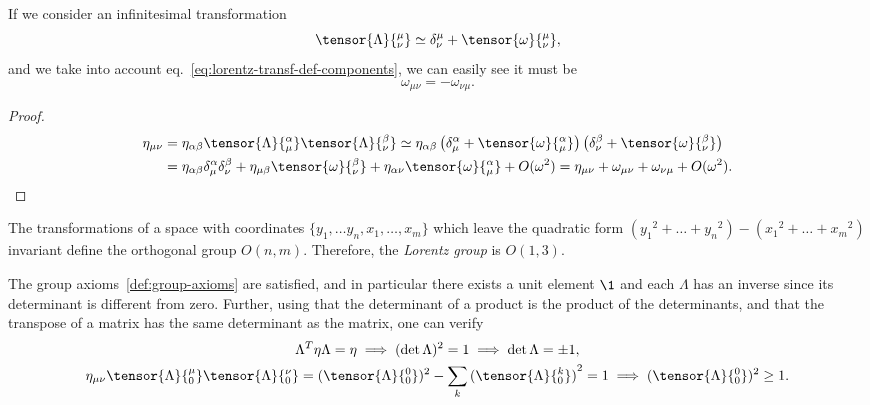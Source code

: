 If we consider an infinitesimal transformation
\begin{equation}
    \tensor{\Lambda}{^\mu_\nu} \simeq \delta^\mu_\nu + \tensor{\omega}{^\mu_\nu} ,
\end{equation}
and we take into account eq.~\eqref{eq:lorentz-transf-def-components}, we can easily see it must be
\begin{equation}\label{eq:parameters-lorentz}
    \omega_{\mu\nu} = -\omega_{\nu\mu} .
\end{equation}
\begin{proof}
    \begin{equation}
    \begin{split}
        \eta_{\mu\nu} &= \eta_{\alpha\beta} \tensor{\Lambda}{^\alpha_\mu} \tensor{\Lambda}{^\beta_\nu}
        \simeq \eta_{\alpha\beta} \left( \delta^\alpha_\mu + \tensor{\omega}{^\alpha_\mu} \right) \left(  \delta^\beta_\nu + \tensor{\omega}{^\beta_\nu} \right) 
        \\ &= \eta_{\alpha\beta} \delta^\alpha_\mu \delta^\beta_\nu + \eta_{\mu\beta} \tensor{\omega}{^\beta_\nu} + \eta_{\alpha\nu} \tensor{\omega}{^\alpha_\mu} + O(\omega^2)
        = \eta_{\mu\nu} + \omega_{\mu\nu} + \omega_{\nu\mu} + O(\omega^2) . \qedhere
    \end{split}
    \end{equation}
\end{proof}

The transformations of a space with coordinates $\{y_1, \dots y_n, x_1, \dots, x_m\}$ which leave the quadratic form $( {y_1}^2 + \dots + {y_n}^2 ) - ( {x_1}^2 + \dots + {x_m}^2 )$ invariant define the orthogonal group $O(n,m)$. Therefore, the \emph{Lorentz group} is $O(1,3)$.

The group axioms~\ref{def:group-axioms} are satisfied, and in particular there exists a unit element $\1$ and each $\Lambda$ has an inverse since its determinant is different from zero. Further, using that the determinant of a product is the product of the determinants, and that the transpose of a matrix has the same determinant as the matrix, one can verify
\begin{subequations}
\begin{gather}
    \Lambda^T \eta \Lambda = \eta \implies (\det \Lambda)^2 = 1 \implies \det \Lambda = \pm 1 , \\
    \eta_{\mu\nu} \tensor{\Lambda}{^\mu_0} \tensor{\Lambda}{^\nu_0} = (\tensor{\Lambda}{^0_0})^2 - \sum_k {(\tensor{\Lambda}{^k_0})}^2 = 1 \implies (\tensor{\Lambda}{^0_0})^2 \geq 1 .
\end{gather}
\end{subequations}

